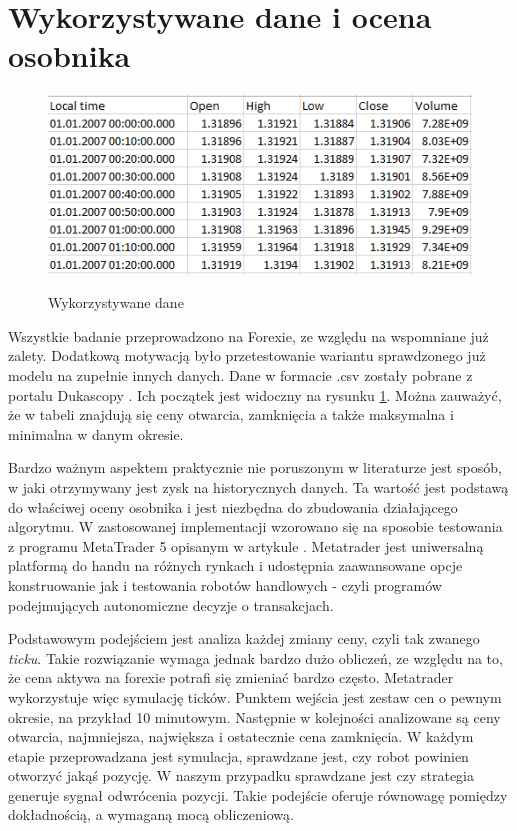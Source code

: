 \documentclass[twoside]{iisthesis}
\begin{document}
\section {Wykorzystywane dane i ocena osobnika}

\begin{figure}[h]
\center
\caption {Wykorzystywane dane}
\includegraphics{data}
\label{fig:data}
\end{figure}

Wszystkie badanie przeprowadzono na Forexie, ze względu na wspomniane już zalety. Dodatkową motywacją było przetestowanie wariantu sprawdzonego już modelu na zupełnie innych danych. Dane w formacie .csv zostały pobrane z portalu Dukascopy \cite{data}. Ich początek jest widoczny na rysunku \ref{fig:data}. Można zauważyć, że w tabeli znajdują się ceny otwarcia, zamknięcia a także maksymalna i minimalna w danym okresie. 

Bardzo ważnym aspektem praktycznie nie poruszonym w literaturze jest sposób, w jaki otrzymywany jest zysk na historycznych danych. Ta wartość jest podstawą do właściwej oceny osobnika i jest niezbędna do zbudowania działającego algorytmu. W zastosowanej implementacji wzorowano się na sposobie testowania z programu MetaTrader 5 opisanym w artykule \cite{metatrader}. Metatrader jest uniwersalną platformą do handu na różnych rynkach i udostępnia zaawansowane opcje konstruowanie jak i testowania robotów handlowych - czyli programów podejmujących autonomiczne decyzje o transakcjach. 

Podstawowym podejściem jest analiza każdej zmiany ceny, czyli tak zwanego \textit{ticku}. Takie rozwiązanie wymaga jednak bardzo dużo obliczeń, ze względu na to, że cena aktywa na forexie potrafi się zmieniać bardzo często. Metatrader wykorzystuje więc symulację ticków. Punktem wejścia jest zestaw cen o pewnym okresie, na przykład 10 minutowym. Następnie w kolejności analizowane są ceny otwarcia, najmniejsza, największa i ostatecznie cena zamknięcia. W każdym etapie przeprowadzana jest symulacja, sprawdzane jest, czy robot powinien otworzyć jakąś pozycję. W naszym przypadku sprawdzane jest czy strategia generuje sygnał odwrócenia pozycji. Takie podejście oferuje równowagę pomiędzy dokładnością, a wymaganą mocą obliczeniową.
\end{document}
